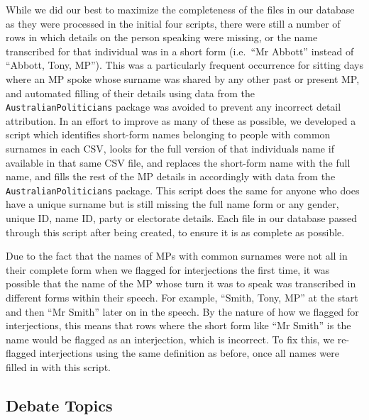 \documentclass[
  letterpaper,
  DIV=11,
  numbers=noendperiod]{scrartcl}
\begin{document}
While we did our best to maximize the completeness of the files in our
database as they were processed in the initial four scripts, there were
still a number of rows in which details on the person speaking were
missing, or the name transcribed for that individual was in a short form
(i.e.~``Mr Abbott'' instead of ``Abbott, Tony, MP''). This was a
particularly frequent occurrence for sitting days where an MP spoke
whose surname was shared by any other past or present MP, and automated
filling of their details using data from the
\texttt{AustralianPoliticians} package was avoided to prevent any
incorrect detail attribution. In an effort to improve as many of these
as possible, we developed a script which identifies short-form names
belonging to people with common surnames in each CSV, looks for the full
version of that individuals name if available in that same CSV file, and
replaces the short-form name with the full name, and fills the rest of
the MP details in accordingly with data from the
\texttt{AustralianPoliticians} package. This script does the same for
anyone who does have a unique surname but is still missing the full name
form or any gender, unique ID, name ID, party or electorate details.
Each file in our database passed through this script after being
created, to ensure it is as complete as possible.

Due to the fact that the names of MPs with common surnames were not all
in their complete form when we flagged for interjections the first time,
it was possible that the name of the MP whose turn it was to speak was
transcribed in different forms within their speech. For example,
``Smith, Tony, MP'' at the start and then ``Mr Smith'' later on in the
speech. By the nature of how we flagged for interjections, this means
that rows where the short form like ``Mr Smith'' is the name would be
flagged as an interjection, which is incorrect. To fix this, we
re-flagged interjections using the same definition as before, once all
names were filled in with this script.

\hypertarget{debate-topics}{%
\subsection{Debate Topics}\label{debate-topics}}
\end{document}
